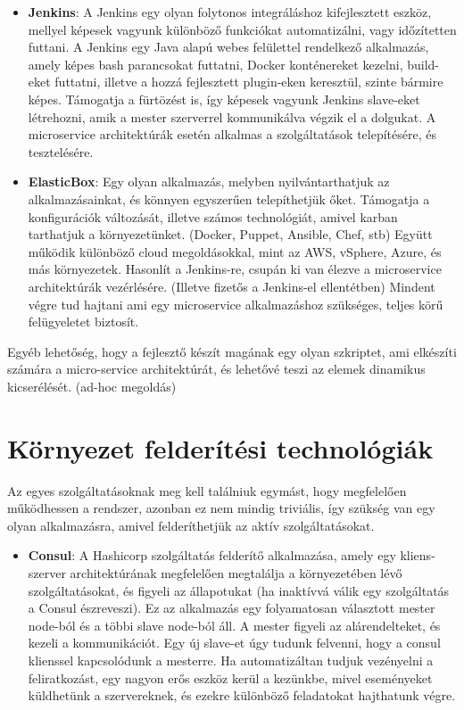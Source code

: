 \documentclass[11pt,magyar,a4paper,oneside,]{report}
\begin{document}
\begin{itemize}
\item
  \textbf{Jenkins}: A Jenkins egy olyan folytonos integráláshoz
  kifejlesztett eszköz, mellyel képesek vagyunk különböző funkciókat
  automatizálni, vagy időzítetten futtani. A Jenkins egy Java alapú
  webes felülettel rendelkező alkalmazás, amely képes bash parancsokat
  futtatni, Docker konténereket kezelni, build-eket futtatni, illetve a
  hozzá fejlesztett plugin-eken keresztül, szinte bármire képes.
  Támogatja a fürtözést is, így képesek vagyunk Jenkins slave-eket
  létrehozni, amik a mester szerverrel kommunikálva végzik el a
  dolgukat. A microservice architektúrák esetén alkalmas a
  szolgáltatások telepítésére, és tesztelésére.
\item
  \textbf{ElasticBox}: Egy olyan alkalmazás, melyben nyilvántarthatjuk
  az alkalmazásainkat, és könnyen egyszerűen telepíthetjük őket.
  Támogatja a konfigurációk változását, illetve számos technológiát,
  amivel karban tarthatjuk a környezetünket. (Docker, Puppet, Ansible,
  Chef, stb) Együtt működik különböző cloud megoldásokkal, mint az AWS,
  vSphere, Azure, és más környezetek. Hasonlít a Jenkins-re, csupán ki
  van élezve a microservice architektúrák vezérlésére. (Illetve fizetős
  a Jenkins-el ellentétben) Mindent végre tud hajtani ami egy
  microservice alkalmazáshoz szükséges, teljes körű felügyeletet
  biztosít.
\end{itemize}

Egyéb lehetőség, hogy a fejlesztő készít magának egy olyan szkriptet,
ami elkészíti számára a micro-service architektúrát, és lehetővé teszi
az elemek dinamikus kicserélését. (ad-hoc megoldás)

\section{Környezet felderítési
technológiák}\label{kuxf6rnyezet-felderuxedtuxe9si-technoluxf3giuxe1k}

Az egyes szolgáltatásoknak meg kell találniuk egymást, hogy megfelelően
működhessen a rendszer, azonban ez nem mindig triviális, így szükség van
egy olyan alkalmazásra, amivel felderíthetjük az aktív szolgáltatásokat.

\begin{itemize}
\itemsep1pt\parskip0pt
\item
  \textbf{Consul}: A Hashicorp szolgáltatás felderítő alkalmazása, amely
  egy kliens-szerver architektúrának megfelelően megtalálja a
  környezetében lévő szolgáltatásokat, és figyeli az állapotukat (ha
  inaktívvá válik egy szolgáltatás a Consul észreveszi). Ez az
  alkalmazás egy folyamatosan választott mester node-ból és a többi
  slave node-ból áll. A mester figyeli az alárendelteket, és kezeli a
  kommunikációt. Egy új slave-et úgy tudunk felvenni, hogy a consul
  klienssel kapcsolódunk a mesterre. Ha automatizáltan tudjuk vezényelni
  a feliratkozást, egy nagyon erős eszköz kerül a kezünkbe, mivel
  eseményeket küldhetünk a szervereknek, és ezekre különböző feladatokat
  hajthatunk végre.
\end{itemize}
\end{document}
